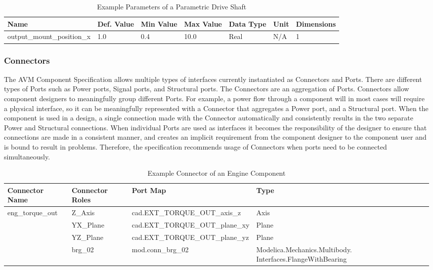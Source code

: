\begin{table}[H]
\begin{center}
\begin{tabular}{|l|l|l|l|l|l|l|}
\hline
 \textbf{Name} & \textbf{Def. Value} & \textbf{Min Value} & \textbf{Max Value} & \textbf{Data Type} & \textbf{Unit} & \textbf{Dimensions}\\
 \hline
 output\_mount\_position\_x & 1.0 & 0.4 & 10.0 & Real & N/A & 1  \\
 \hline
\end{tabular}
\caption{Example Parameters of a Parametric Drive Shaft}
\end{center}
\label{Parameters_Table}
\end{table}


\subsubsection{Connectors}
The AVM Component Specification allows multiple types of interfaces currently instantiated as Connectors and Ports. There are different types of Ports such as Power ports, Signal ports, and Structural ports. The Connectors are an aggregation of Ports. Connectors allow component designers to meaningfully group different Ports. For example, a power flow through a component will in most cases will require a physical interface, so it can be meaningfully represented with a Connector that aggregates a Power port, and a Structural port. When the component is used in a design, a single connection made with the Connector automatically and consistently results in the two separate Power and Structural connections. When individual Ports are used as interfaces it becomes the responsibility of the designer to ensure that connections are made in a consistent manner, and creates an implicit requirement from the component designer to the component user and is bound to result in problems. Therefore, the specification recommends usage of Connectors when ports need to be connected simultaneously. 

\begin{table}[H]
\begin{center}
\begin{tabular}{|l|l|l|p{5cm}|}
\hline
 \textbf{Connector Name} & \textbf{Connector Roles} & \textbf{Port Map} & \textbf{Type} \\
 \hline
 eng\_torque\_out & Z\_Axis & cad.EXT\_TORQUE\_OUT\_axis\_z & Axis  \\
  & YX\_Plane & cad.EXT\_TORQUE\_OUT\_plane\_xy & Plane  \\
  & YZ\_Plane & cad.EXT\_TORQUE\_OUT\_plane\_yz & Plane \\
  & brg\_02 & mod.conn\_brg\_02 & Modelica.Mechanics.Multibody.
  Interfaces.FlangeWithBearing  \\
 \hline
\end{tabular}
\caption{Example Connector of an Engine Component}
\end{center}
\label{Properties_Table}
\end{table}

